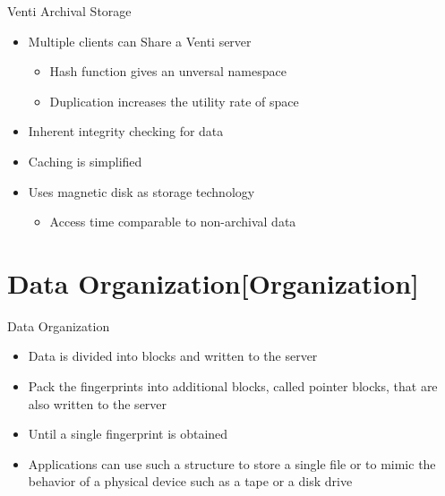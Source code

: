 \begin{frame}{Venti Archival Storage}

\begin{itemize}
\itemsep1pt\parskip0pt
\item
  Multiple clients can Share a Venti server

  \begin{itemize}
  \itemsep1pt\parskip0pt
  \item
    Hash function gives an unversal namespace
  \item
    Duplication increases the utility rate of space
  \end{itemize}
\item
  Inherent integrity checking for data
\item
  Caching is simplified
\item
  Uses magnetic disk as storage technology

  \begin{itemize}
  \itemsep1pt\parskip0pt
  \item
    Access time comparable to non-archival data
  \end{itemize}
\end{itemize}

\end{frame}

\section{Data
Organization{[}Organization{]}}\label{data-organizationorganization}

\begin{frame}{Data Organization}

\begin{itemize}
\itemsep1pt\parskip0pt
\item
  Data is divided into blocks and written to the server
\item
  Pack the fingerprints into additional blocks, called pointer blocks,
  that are also written to the server
\item
  Until a single fingerprint is obtained
\item
  Applications can use such a structure to store a single file or to
  mimic the behavior of a physical device such as a tape or a disk drive
\end{itemize}

\end{frame}

